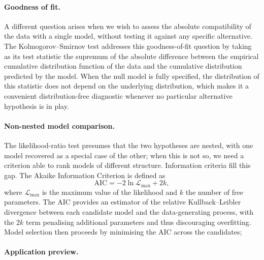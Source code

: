 \paragraph{Goodness of fit.}

A different question arises when we wish to assess the absolute compatibility of the data with a single model, without testing it against any specific alternative.
The Kolmogorov--Smirnov test \cite{KS_test} addresses this goodness-of-fit question by taking as its test statistic the supremum of the absolute difference between the empirical cumulative distribution function of the data and the cumulative distribution predicted by the model.
When the null model is fully specified, the distribution of this statistic does not depend on the underlying distribution, which makes it a convenient distribution-free diagnostic whenever no particular alternative hypothesis is in play.

\paragraph{Non-nested model comparison.}

The likelihood-ratio test presumes that the two hypotheses are nested, with one model recovered as a special case of the other; when this is not so, we need a criterion able to rank models of different structure.
Information criteria fill this gap.
The Akaike Information Criterion \cite{Akaike:1974} is defined as
\begin{equation}
	\mathrm{AIC} = -2 \ln \mathcal{L}_{\max} + 2k,
	\label{eq:aic}
\end{equation}
where $\mathcal{L}_{\max}$ is the maximum value of the likelihood and $k$ the number of free parameters.
The AIC provides an estimator of the relative Kullback--Leibler divergence between each candidate model and the data-generating process, with the $2k$ term penalising additional parameters and thus discouraging overfitting.
Model selection then proceeds by minimising the AIC across the candidates; 

\paragraph{Application preview.}


